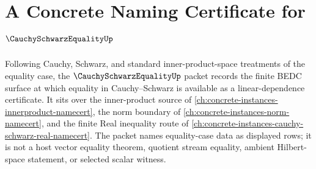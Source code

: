 \chapter{A Concrete Naming Certificate for $\CauchySchwarzEqualityUp$}
\label{ch:concrete-instances-cauchy-schwarz-equality-namecert}

Following Cauchy, Schwarz, and standard inner-product-space treatments of the equality case, the $\CauchySchwarzEqualityUp$ packet records the finite BEDC surface at which equality in Cauchy--Schwarz is available as a linear-dependence certificate. It sits over the inner-product source of \autoref{ch:concrete-instances-innerproduct-namecert}, the norm boundary of \autoref{ch:concrete-instances-norm-namecert}, and the finite Real inequality route of \autoref{ch:concrete-instances-cauchy-schwarz-real-namecert}. The packet names equality-case data as displayed rows; it is not a host vector equality theorem, quotient stream equality, ambient Hilbert-space statement, or selected scalar witness.

